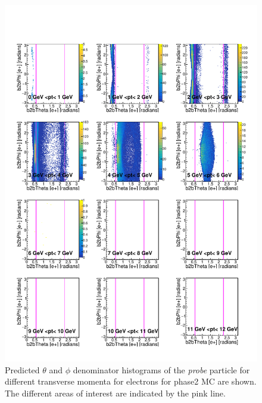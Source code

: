 \documentclass[a4paper,11pt,twosided,final,german,openbib,pdftex,listof=totoc,bibliography=totoc]{scrbook}
\begin{document}
\begin{appendix}
\begin{figure}[h!]
	\includegraphics[width=\textwidth]{Plots/master/RTPtMemE_MC.pdf}
	\caption[Enumerator $\theta$-$\phi$ Electron Transverse Momentum Phase2 MC]{Predicted $\theta$ and $\phi$ denominator histograms of the \textit{probe} particle for different transverse momenta for electrons for phase2 MC are shown. The different areas of interest are indicated by the pink line.}
	\label{plt:RTPtMemE_MC}
\end{figure}



\end{appendix}
\end{document}
